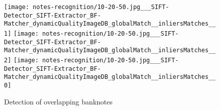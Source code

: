 \begin{figure}[H]
	\centering
	\texttt{[image: notes-recognition/10-20-50.jpg\_\_\_SIFT-Detector\_SIFT-Extractor\_BF-Matcher\_dynamicQualityImageDB\_globalMatch\_\_inliersMatches\_\_1]}
	\texttt{[image: notes-recognition/10-20-50.jpg\_\_\_SIFT-Detector\_SIFT-Extractor\_BF-Matcher\_dynamicQualityImageDB\_globalMatch\_\_inliersMatches\_\_2]}
	\texttt{[image: notes-recognition/10-20-50.jpg\_\_\_SIFT-Detector\_SIFT-Extractor\_BF-Matcher\_dynamicQualityImageDB\_globalMatch\_\_inliersMatches\_\_0]}
	\caption{Detection of overlapping banknotes}
	\label{fig:recognition-overlapping-banknotes}
\end{figure}
